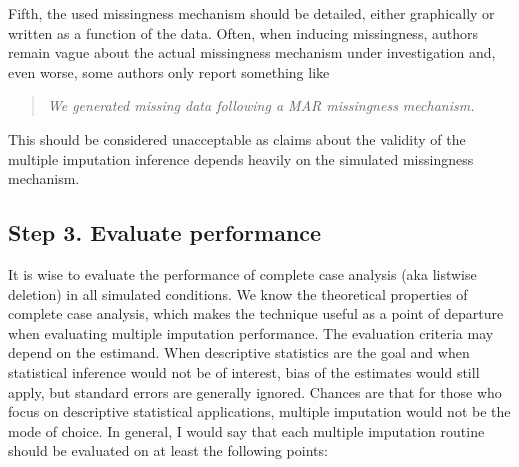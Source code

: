 \documentclass[12pt, a4paper]{article}
\begin{document}
Fifth, the used missingness mechanism should be detailed, either graphically or written as a function of the data. Often, when inducing missingness, authors remain vague about the actual missingness mechanism under investigation and, even worse, some authors only report something like
\begin{quote}
\emph{We generated missing data following a MAR missingness mechanism.}
\end{quote}
This should be considered unacceptable as claims about the validity of the multiple imputation inference depends heavily on the simulated missingness mechanism. 

\subsection*{Step 3. Evaluate performance}
It is wise to evaluate the performance of complete case analysis (aka listwise deletion) in all simulated conditions. We know the theoretical properties of complete case analysis, which makes the technique useful as a point of departure when evaluating multiple imputation performance. 
The evaluation criteria may depend on the estimand. When descriptive statistics are the goal and when statistical inference would not be of interest, bias of the estimates would still apply, but standard errors are generally ignored. Chances are that for those who focus on descriptive statistical applications, multiple imputation would not be the mode of choice. In general, I would say that each multiple imputation routine should be evaluated on at least the following points:
\end{document}
